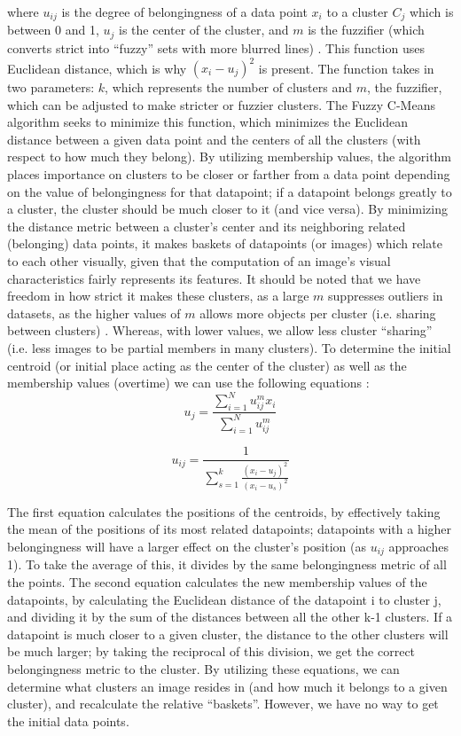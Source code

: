 \documentclass[10pt,twocolumn]{article}
\begin{document}
where \(u_{ij}\) is the degree of belongingness of a data point \(x_i \) to a cluster \(C_j \) which is between 0 and 1, \(u_j \) is the center of the cluster, and \(m \) is the fuzzifier (which converts strict into “fuzzy” sets with more blurred lines) \cite{PrasadClustering}. This function uses Euclidean distance, which is why \((x_i - u_j)^2 \) is present. The function takes in two parameters: \(k\), which represents the number of clusters and \(m \), the fuzzifier, which can be adjusted to make stricter or fuzzier clusters. The Fuzzy C-Means algorithm seeks to minimize this function, which minimizes the Euclidean distance between a given data point and the centers of all the clusters (with respect to how much they belong). By utilizing membership values, the algorithm places importance on clusters to be closer or farther from a data point depending on the value of belongingness for that datapoint; if a datapoint belongs greatly to a cluster, the cluster should be much closer to it (and vice versa). By minimizing the distance metric between a cluster’s center and its neighboring related (belonging) data points, it makes baskets of datapoints (or images) which relate to each other visually, given that the computation of an image's visual characteristics fairly represents its features. It should be noted that we have freedom in how strict it makes these clusters, as a large \(m \) suppresses outliers in datasets, as the higher values of \(m \) allows more objects per cluster (i.e. sharing between clusters) \cite{Schwammle2010}. Whereas, with lower values, we allow less cluster “sharing” (i.e. less images to be partial members in many clusters). To determine the initial centroid (or initial place acting as the center of the cluster) as well as the membership values (overtime) we can use the following equations \cite{Schwammle2010}: 
\[u_j = \frac{\sum_{i=1}^N u_{ij}^m x_i}{\sum_{i=1}^Nu_{ij}^m}\] 

\[u_{ij} = \frac{1}{\sum_{s=1}^k \frac{(x_i - u_j)^2}{(x_i - u_s)^2} }\] 

The first equation calculates the positions of the centroids, by effectively taking the mean of the positions of its most related datapoints; datapoints with a higher belongingness will have a larger effect on the cluster's position (as \(u_{ij}\) approaches 1). To take the average of this, it divides by the same belongingness metric of all the points.
The second equation calculates the new membership values of the datapoints, by calculating the Euclidean distance of the datapoint i to cluster j, and dividing it by the sum of the distances between all the other k-1 clusters. If a datapoint is much closer to a given cluster, the distance to the other clusters will be much larger; by taking the reciprocal of this division, we get the correct belongingness metric to the cluster. By utilizing these equations, we can determine what clusters an image resides in (and how much it belongs to a given cluster), and recalculate the relative “baskets”. However, we have no way to get the initial data points.
\end{document}
